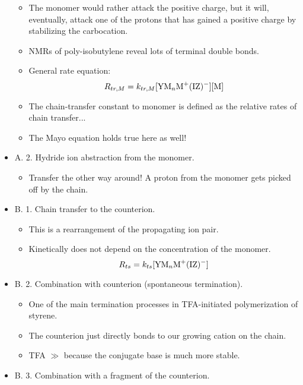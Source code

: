 \documentclass[../notes.tex]{subfiles}
\begin{document}
\begin{itemize}
\begin{itemize}
        \item The monomer would rather attack the positive charge, but it will, eventually, attack one of the protons that has gained a positive charge by stabilizing the carbocation.
        \item NMRs of poly-isobutylene reveal lots of terminal double bonds.
        \item General rate equation:
        \begin{equation*}
            R_{tr,M} = k_{tr,M}[\ce{YM_nM+(IZ)-}][\ce{M}]
        \end{equation*}
        \item The chain-transfer constant to monomer is defined as the relative rates of chain transfer...
        \item The Mayo equation holds true here as well!
    \end{itemize}
    \item A. 2. Hydride ion abstraction from the monomer.
    \begin{itemize}
        \item Transfer the other way around! A proton from the monomer gets picked off by the chain.
    \end{itemize}
    \item B. 1. Chain transfer to the counterion.
    \begin{itemize}
        \item This is a rearrangement of the propagating ion pair.
        \item Kinetically does not depend on the concentration of the monomer.
        \begin{equation*}
            R_{ts} = k_{ts}[\ce{YM_nM+(IZ)-}]
        \end{equation*}
    \end{itemize}
    \item B. 2. Combination with counterion (spontaneous termination).
    \begin{itemize}
        \item One of the main termination processes in TFA-initiated polymerization of styrene.
        \item The counterion just directly bonds to our growing cation on the chain.
        \item TFA $\gg$  because the conjugate base is much more stable.
    \end{itemize}
    \item B. 3. Combination with a fragment of the counterion.
    \begin{itemize}

\end{itemize}
\end{itemize}
\end{document}
